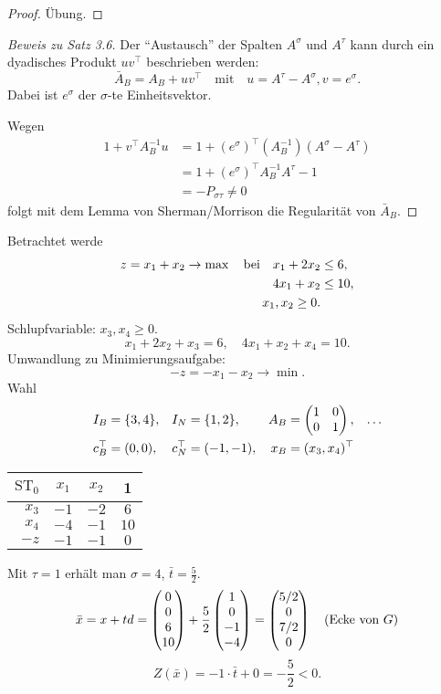 \begin{proof}
  Übung.
\end{proof}

\begin{proof}[Beweis zu Satz 3.6]
  Der ``Austausch'' der Spalten $A^\sigma$ und $A^\tau$ kann durch ein
  dyadisches Produkt $uv^\top$ beschrieben werden:
  \[ \bar{A}_B = A_B + uv^\top \quad \text{mit} \quad u = A^\tau - A^\sigma, v =
    e^\sigma. \]
  Dabei ist $e^\sigma$ der $\sigma$-te Einheitsvektor.

  Wegen
  \[ \begin{aligned}
      1 + v^\top A_B^{-1} u
      &= 1 + (e^\sigma)^\top (A_B^{-1}) (A^\sigma - A^\tau) \\
      &= 1 + (e^\sigma)^\top A_B^{-1} A^\tau - 1 \\
      &= - P_{\sigma \tau} \ne 0
    \end{aligned} \]
  folgt mit dem Lemma von Sherman/Morrison die Regularität von $\bar{A}_B$.
\end{proof}

\begin{exmp}
  Betrachtet werde
  \[ \begin{aligned} z = x_1 + x_2 \to \max \quad \text{bei} \quad x_1 + 2 x_2 &\le 6, \\
      4x_1 + x_2 &\le 10, \\
      x_1, x_2 \ge 0.
    \end{aligned}
  \]
  Schlupfvariable: $x_3, x_4 \ge 0$.
  \[ x_1 + 2x_2 + x_3 = 6, \quad 4x_1 + x_2 + x_4 = 10. \]
  Umwandlung zu Minimierungsaufgabe:
  \[ -z = -x_1 - x_2 \to \min. \]
  Wahl
  \begin{align*}
    I_B &= \{3,4\}, & I_N &= \{1,2\}, & A_B &= \begin{pmatrix} 1 & 0 \\ 0 & 1 \end{pmatrix}, & \ldots
    \\
    c_B^\top &= (0,0), & c_N^\top &= (-1,-1), & x_B &= (x_3, x_4)^\top
  \end{align*}
  \begin{center}
    \begin{tabular}{r|ccc}
      $\mathrm{ST}_0$ & $x_1$ & $x_2$ & 1 \\
      \hline
      $x_3$ & $-1$ & $-2$ & $6$ \\
      $x_4$ & $-4$ & $-1$ & $10$ \\
      \hline
      $-z$ & $-1$ & $-1$ & $0$
    \end{tabular}
  \end{center}
  Mit $\tau = 1$ erhält man $\sigma = 4$, $\bar{t} = \frac{5}{2}$.
  \[ \bar{x} = x + td = \begin{pmatrix} 0 \\ 0 \\ 6 \\ 10 \end{pmatrix} + \frac{5}{2}
    \begin{pmatrix}1 \\ 0 \\ -1 \\ -4\end{pmatrix} =\begin{pmatrix} 5/2 \\ 0 \\ 7/2 \\ 0 \end{pmatrix} \quad \text{(Ecke
      von $G$)} \]
  \[ Z(\bar{x}) = -1 \cdot \bar{t} + 0 = -\frac{5}{2} < 0. \]
\end{exmp}

